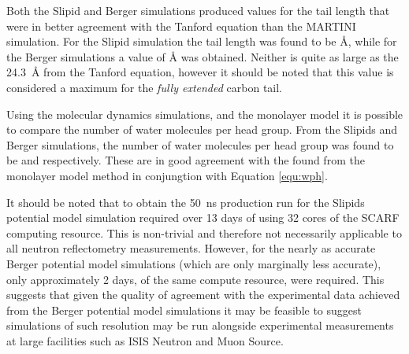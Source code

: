 \documentclass[amsmath,amssymb,twocolumn,superscriptaddress]{revtex4-1}
\begin{document}
Both the Slipid and Berger simulations produced values for the tail length that were in better agreement with the Tanford equation than the MARTINI simulation.
For the Slipid simulation the tail length was found to be \si{\angstrom}, while for the Berger simulations a value of \si{\angstrom} was obtained.
Neither is quite as large as the \SI{24.3}{\angstrom} from the Tanford equation, however it should be noted that this value is considered a maximum for the \emph{fully extended} carbon tail.

Using the molecular dynamics simulations, and the monolayer model it is possible to compare the number of water molecules per head group.
From the Slipids and Berger simulations, the number of water molecules per head group was found to be  and  respectively.
These are in good agreement with the  found from the monolayer model method in conjungtion with Equation \ref{equ:wph}.

It should be noted that to obtain the \SI{50}{\nano\second} production run for the Slipids potential model simulation required over 13 days of using 32 cores of the SCARF computing resource.
This is non-trivial and therefore not necessarily applicable to all neutron reflectometry measurements.
However, for the nearly as accurate Berger potential model simulations (which are only marginally less accurate), only approximately 2 days, of the same compute resource, were required.
This suggests that given the quality of agreement with the experimental data achieved from the Berger potential model simulations it may be feasible to suggest simulations of such resolution may be run alongside experimental measurements at large facilities such as ISIS Neutron and Muon Source.
\end{document}
